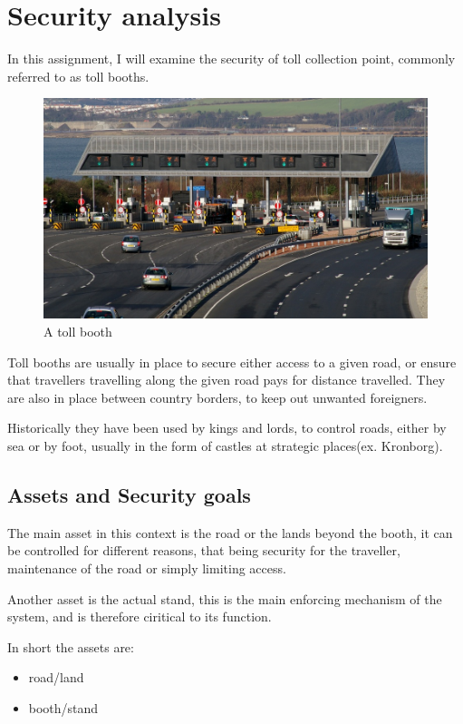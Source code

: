 \section{Security analysis}
In this assignment, I will examine the security of toll collection point, 
commonly referred to as toll booths. 

\begin{figure}[h]
\centering
\includegraphics[scale=0.2]{toll_booth}
\caption{A toll booth}
\label{fig:booth}
\end{figure}

Toll booths are usually in place to secure either access to a given road, or
ensure that travellers travelling along the given road pays for distance
travelled. They are also in place between country borders, to keep out unwanted
foreigners.

Historically they have been used by kings and lords, to control roads, either
by sea or by foot, usually in the form of castles at strategic places(ex.
Kronborg).

\subsection{Assets and Security goals}
The main asset in this context is the road or the lands beyond the booth, it 
can be controlled for different reasons, that being security for the traveller,
maintenance of the road or simply limiting access.

Another asset is the actual stand, this is the main enforcing mechanism of the 
system, and is therefore ciritical to its function.

In short the assets are:
\begin{itemize}
\item road/land
\item booth/stand
\end{itemize}

